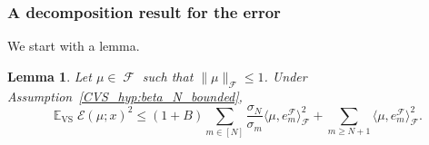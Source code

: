 \documentclass[twoside,11pt]{book}
\newtheorem{lemma}{Lemma}
\numberwithin{theorem}{chapter}
\numberwithin{definition}{chapter}
\numberwithin{proposition}{chapter}
\numberwithin{corollary}{chapter}
\numberwithin{example}{chapter}
\numberwithin{lemma}{chapter}
\numberwithin{assumption}{chapter}
\numberwithin{equation}{chapter}
\numberwithin{figure}{chapter}
\DeclareMathOperator{\VS}{\mathrm{VS}}
\DeclareMathOperator{\EX}{\mathbb{E}}
\DeclareMathOperator{\F}{\mathcal{F}}
\newcommand{\rb}[1]{\textcolor{magenta}{#1}}
\begin{document}
\subsubsection{A decomposition result for the error}
We start with a lemma.
\begin{lemma}\label{CVS_lemma:delayed_bounds}
Let $\mu \in \F$ such that $\|\mu\|_{\F} \leq 1$. Under Assumption~\ref{CVS_hyp:beta_N_bounded},
\begin{equation}\label{CVS_eq:EX_VS_slow_rates}
\EX_{\VS} \mathcal{E}(\mu;x)^{2} \leq (1+B) \sum\limits_{m \in [N]} \frac{\sigma_{N}}{\sigma_{m}} \langle \mu,e_{m}^{\F} \rangle_{\F}^{2} + \sum\limits_{m \geq N+1} \langle \mu,e_{m}^{\F} \rangle_{\F}^{2}.
\end{equation}
\end{lemma}
\end{document}
